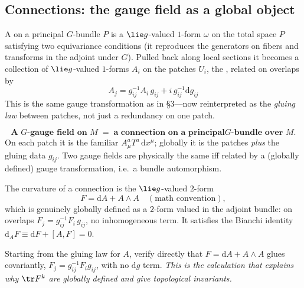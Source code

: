 \documentclass[11pt]{article}
\newcommand{\dd}{\mathrm{d}}                 %
\begin{document}
\subsection{Connections: the gauge field as a global object}

\begin{ddefinition}
A  on a principal $G$-bundle $P$ is a $\lie g$-valued $1$-form $\omega$
on the total space $P$ satisfying two equivariance conditions (it reproduces the
generators on fibers and transforms in the adjoint under $G$). Pulled back along local
sections it becomes a collection of $\lie g$-valued $1$-forms $A_i$ on the patches $U_i$,
the , related on overlaps by
\[
\boxed{\;A_j = g_{ij}^{-1}A_i\,g_{ij} + i\,g_{ij}^{-1}\dd g_{ij}\;}
\]
This is the same gauge transformation as in \S3---now reinterpreted as the
\emph{gluing law} between patches, not just a redundancy on one patch.
\end{ddefinition}

\begin{eequation}
\[
\textbf{A $G$-gauge field on $M$} \;=\; \textbf{a connection on a principal
$G$-bundle over $M$.}
\]
On each patch it is the familiar $A_\mu^a T^a\,\dd x^\mu$; globally it is the patches
\emph{plus} the gluing data $g_{ij}$. Two gauge fields are physically the same iff
related by a (globally defined) gauge transformation, i.e.\ a bundle automorphism.
\end{eequation}

\begin{ddefinition}[Curvature]
The curvature of a connection is the $\lie g$-valued $2$-form
\[
F = \dd A + A\wedge A \quad(\text{math convention}),
\]
which is genuinely globally defined as a $2$-form valued in the adjoint bundle: on
overlaps $F_j = g_{ij}^{-1}F_i\,g_{ij}$, no inhomogeneous term. It satisfies the Bianchi
identity $\dd_A F \equiv \dd F + [A,F] = 0$.
\end{ddefinition}

\begin{xca}
Starting from the gluing law for $A$, verify directly that $F=\dd A + A\wedge A$ glues
covariantly, $F_j = g_{ij}^{-1}F_i g_{ij}$, with no $\dd g$ term. \emph{This is the
calculation that explains why $\tr F^k$ are globally defined and give topological
invariants.}
\end{xca}
\end{document}
